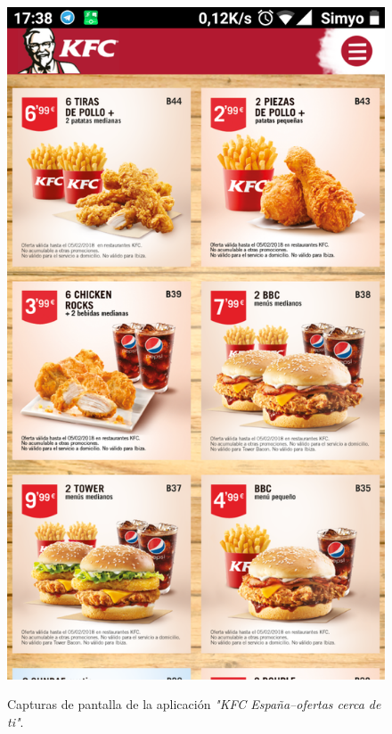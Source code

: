 \documentclass[twoside]{report}
\begin{document}
\begin{figure}[H]
\begin{center}
\includegraphics[scale=0.25]{images/restaurantes/kfc1.png}
\caption{Capturas de pantalla de la aplicación \textit{"KFC España–ofertas cerca de ti"}.} \cite{kfcapp}
\end{center}
\end{figure}
\end{document}
